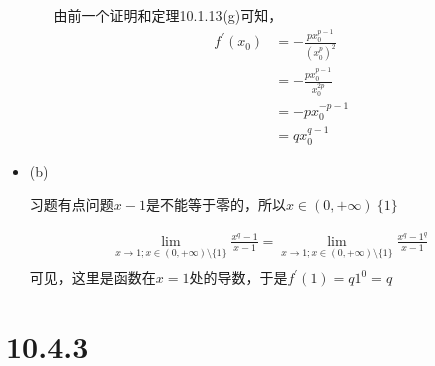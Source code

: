 \documentclass{article}
\begin{document}
\begin{itemize}
\begin{itemize}
                由前一个证明和定理10.1.13(g)可知，
                \begin{align*}
                  f^\prime(x_0) & = - \frac{p x_0^{p - 1}}{(x_0^p)^2} \\
                                & = - \frac{p x_0^{p - 1}}{x_0^{2p}}  \\
                                & = - p x_0^{-p - 1}                  \\
                                & = q x_0^{q - 1}
                \end{align*}

        \end{itemize}

  \item (b)

        \begin{zremark}
          习题有点问题$x - 1$是不能等于零的，所以$x \in (0, +\infty) \ \{1\}$
        \end{zremark}

        \begin{align*}
          \lim\limits_{x \to 1; x \in (0, +\infty) \setminus \{1\}} \frac{x^q - 1}{x - 1}
          = \lim\limits_{x \to 1; x \in (0, +\infty) \setminus \{1\}} \frac{x^q - 1^q}{x - 1} \\
        \end{align*}
        可见，这里是函数在$x=1$处的导数，于是$f^\prime(1) = q1^0 = q$
\end{itemize}

\section*{10.4.3}
\end{document}
